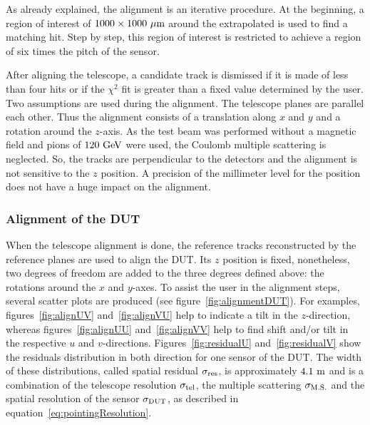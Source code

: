       As already explained, the alignment is an iterative procedure.
      At the beginning, a region of interest of $1000 \times 1000~\rm{\mu m}$ around the extrapolated is used to find a matching hit.
      Step by step, this region of interest is restricted to achieve a region of six times the pitch of the sensor.
      
      After aligning the telescope, a candidate track is dismissed if it is made of less than four hits or if the $\chi^2$ fit is greater than a fixed value determined by the user. 
      Two assumptions are used during the alignment. 
      The telescope planes are parallel each other.
      Thus the alignment consists of a translation along $x$ and $y$ and a rotation around the $z$-axis.
      As the test beam was performed without a magnetic field and pions of $120~\rm{GeV}$ were used, the Coulomb multiple scattering is neglected.
      So, the tracks are perpendicular to the detectors and the alignment is not sensitive to the $z$ position.
      A precision of the millimeter level for the position does not have a huge impact on the alignment.

      \subsubsection{Alignment of the DUT}

      When the telescope alignment is done, the reference tracks reconstructed by the reference planes are used to align the \gls{DUT}.
      Its $z$ position is fixed, nonetheless, two degrees of freedom are added to the three degrees defined above: the rotations around the $x$ and $y$-axes.
      To assist the user in the alignment steps, several scatter plots are produced (see figure~\ref{fig:alignmentDUT}).
      For examples, figures~\ref{fig:alignUV} and~\ref{fig:alignVU} help to indicate a tilt in the $z$-direction, whereas figures~\ref{fig:alignUU} and~\ref{fig:alignVV} help to find shift and/or tilt in the respective $u$ and $v$-directions.
      Figures~\ref{fig:residualU} and~\ref{fig:residualV} show the residuals distribution in both direction for one sensor of the \gls{DUT}.
      The width of these distributions, called spatial residual $\sigma_{\rm{res}}$, is approximately $4.1~\rm{m}$ and is a combination of the telescope resolution $\sigma_{\rm{tel}}$, the multiple scattering $\sigma_{\rm{M.S.}}$ and the spatial resolution of the sensor $\sigma_{\rm{DUT}}$, as described in equation~\ref{eq:pointingResolution}.
      
